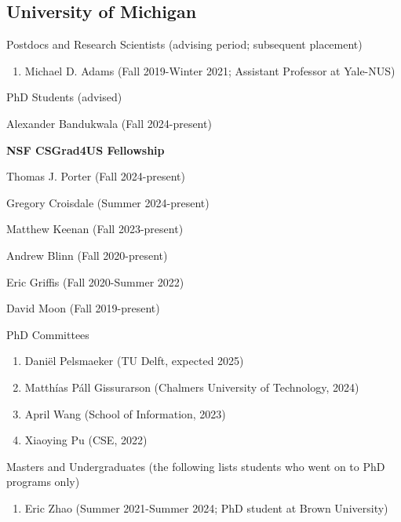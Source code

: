 \documentclass[10pt,letterpaper]{article}
\renewenvironment{itemize}{
  \begin{list}{}{
    \setlength{\leftmargin}{1.25em}
    \setlength{\itemsep}{0.25em}
    \setlength{\parskip}{0pt}
    \setlength{\parsep}{0.2em}
  }
}{
  \end{list}
}
\begin{document}
\subsection*{University of Michigan}
\begin{itemize}
  \item Postdocs and Research Scientists (advising period; subsequent placement)
        \begin{enumerate}
          \item Michael D. Adams (Fall 2019-Winter 2021; Assistant Professor at Yale-NUS)
        \end{enumerate}
  \item PhD Students (advised)
        \begin{enumerate}
          \item Alexander Bandukwala (Fall 2024-present)
            \begin{itemize}
              \item \textbf{NSF CSGrad4US Fellowship}
            \end{itemize}
          \item Thomas J. Porter (Fall 2024-present)
          \item Gregory Croisdale (Summer 2024-present)
          \item Matthew Keenan (Fall 2023-present)
          \item Andrew Blinn (Fall 2020-present)
          \item Eric Griffis (Fall 2020-Summer 2022)
          \item David Moon (Fall 2019-present)
        \end{enumerate}
  \item PhD Committees
        \begin{enumerate}
          \item Daniël Pelsmaeker (TU Delft, expected 2025)
          \item Matthías Páll Gissurarson (Chalmers University of Technology, 2024)
          \item April Wang (School of Information, 2023)
          \item Xiaoying Pu (CSE, 2022)
        \end{enumerate}
  \item Masters and Undergraduates (the following lists students who went on to PhD programs only)
        \begin{enumerate}
          \item Eric Zhao (Summer 2021-Summer 2024; PhD student at Brown University)

\end{enumerate}
\end{itemize}
\end{document}
